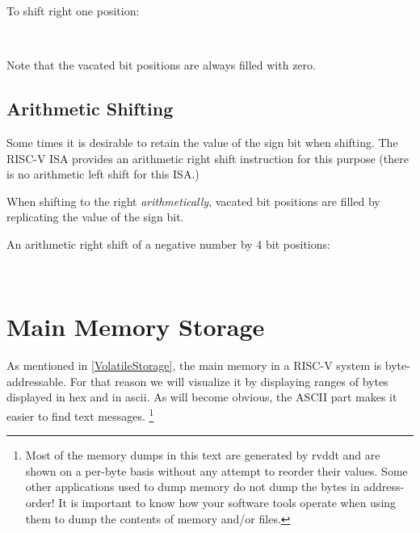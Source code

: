 To shift right one position:

\\

\begin{tcolorbox}
Note that the vacated bit positions are always filled with zero.
\end{tcolorbox}

\subsection{Arithmetic Shifting}

Some times it is desirable to retain the value of the sign bit when
shifting.  The RISC-V ISA provides an arithmetic right shift 
instruction for this purpose (there is no arithmetic left shift for 
this ISA.)

\begin{tcolorbox}
When shifting to the right {\em arithmetically}, vacated bit positions are
filled by replicating the value of the sign bit. 
\end{tcolorbox}

An arithmetic right shift of a negative number by 4 bit positions:

\\

\section{Main Memory Storage}

As mentioned in \autoref{VolatileStorage}, the main memory in a RISC-V 
system is byte-addressable.  For that reason we will visualize it by 
displaying ranges of bytes displayed in hex and in \gls{ascii}.  As will 
become obvious, the ASCII part makes it easier to find text messages.%
\footnote{Most of the memory dumps in this text are generated by \gls{rvddt}
and are shown on a per-byte basis without any attempt to reorder their
values. Some other applications used to dump memory do not dump the bytes
in address-order!  It is important to know how your software tools operate
when using them to dump the contents of memory and/or files.}

